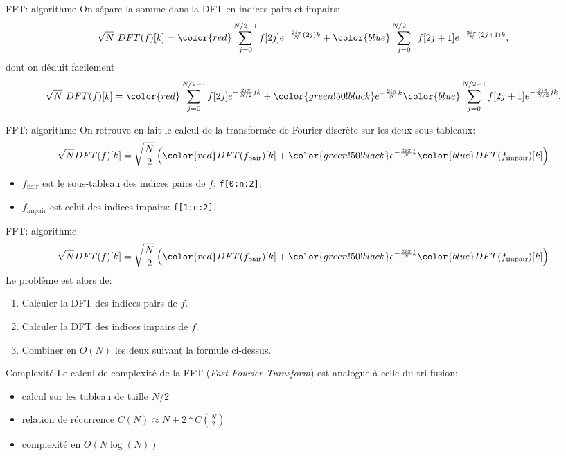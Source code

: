 \begin{frame}{FFT: algorithme}
On sépare la somme dans la DFT en indices {\color{red} pairs} et {\color{blue} impairs}:
\[\sqrt{N}~DFT(f)[k] =
{\color{red}\sum_{j=0}^{N/2-1}f[2j]e^{-\frac{2i\pi}{N} (2j)k}} +
{\color{blue} \sum_{j=0}^{N/2-1}f[2j+1]e^{-\frac{2i\pi}{N} (2j+1)k}},\]
dont on déduit facilement
\[\sqrt{N}~DFT(f)[k] =
{\color{red}\sum_{j=0}^{N/2-1}f[2j]e^{-\frac{2i\pi}{N/2} jk}} +
{\color{green!50!black} e^{-\frac{2i\pi}{N}k}}
{\color{blue} \sum_{j=0}^{N/2-1}f[2j+1]e^{-\frac{2i\pi}{N/2} jk}}.\]
\end{frame}

\begin{frame}{FFT: algorithme}
On retrouve en fait le calcul de la transformée de Fourier discrète sur les deux sous-tableaux:
\begin{equation}
\sqrt{N} DFT(f)[k] = \sqrt{\frac{N}{2}}
\left(
{\color{red} DFT(f_\text{pair})[k]} + {\color{green!50!black} e^{-\frac{2i\pi}{N}k}} {\color{blue} DFT(f_\text{impair})[k]}
\right)
\end{equation}
\begin{itemize}
	\item $f_\text{pair}$ est le sous-tableau des indices pairs de $f$: \texttt{f[0:n:2]};
	\item $f_\text{impair}$ est celui des indices impairs: \texttt{f[1:n:2]}.
\end{itemize}
\end{frame}

\begin{frame}{FFT: algorithme}
\begin{equation}
\sqrt{N} DFT(f)[k] = \sqrt{\frac{N}{2}}
\left(
{\color{red} DFT(f_\text{pair})[k]} + {\color{green!50!black} e^{-\frac{2i\pi}{N}k}} {\color{blue} DFT(f_\text{impair})[k]}
\right)
\end{equation}
Le problème est alors de:
\begin{enumerate}
    \item Calculer la DFT des indices pairs de $f$.
    \item Calculer la DFT des indices impairs de $f$.
    \item Combiner en $O(N)$ les deux suivant la formule ci-dessus.
\end{enumerate}
\end{frame}

\begin{frame}{Complexité}
Le calcul de complexité de la FFT (\emph{Fast Fourier Transform}) est analogue à celle du tri fusion:
\begin{itemize}
    \item calcul sur les tableau de taille $N/2$
    \item relation de récurrence $C(N) \approx N + 2*C(\frac{N}{2})$
    \item complexité en $O(N \log(N))$
\end{itemize}
\end{frame}

